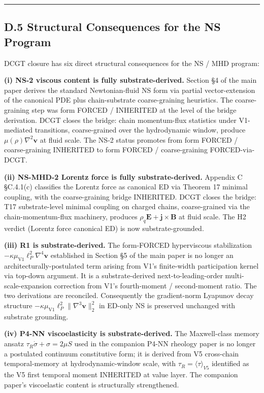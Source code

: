 \documentclass[
]{article}
\begin{document}
\begin{center}\rule{0.5\linewidth}{0.5pt}\end{center}

\subsection{D.5 Structural Consequences for the NS
Program}\label{d.5-structural-consequences-for-the-ns-program}

DCGT closure has six direct structural consequences for the NS / MHD
program:

\textbf{(i) NS-2 viscous content is fully substrate-derived.} Section §4
of the main paper derives the standard Newtonian-fluid NS form via
partial vector-extension of the canonical PDE plus chain-substrate
coarse-graining heuristics. The coarse-graining step was form FORCED /
INHERITED at the level of the bridge derivation. DCGT closes the bridge:
chain momentum-flux statistics under V1-mediated transitions,
coarse-grained over the hydrodynamic window, produce
\(\mu(\rho)\nabla^2\mathbf{v}\) at fluid scale. The NS-2 status promotes
from form FORCED / coarse-graining INHERITED to form FORCED /
coarse-graining FORCED-via-DCGT.

\textbf{(ii) NS-MHD-2 Lorentz force is fully substrate-derived.}
Appendix C §C.4.1(c) classifies the Lorentz force as canonical ED via
Theorem 17 minimal coupling, with the coarse-graining bridge INHERITED.
DCGT closes the bridge: T17 substrate-level minimal coupling on charged
chains, coarse-grained via the chain-momentum-flux machinery, produces
\(\rho_q\mathbf{E} + \mathbf{j}\times\mathbf{B}\) at fluid scale. The H2
verdict (Lorentz force canonical ED) is now substrate-grounded.

\textbf{(iii) R1 is substrate-derived.} The form-FORCED hyperviscous
stabilization \(-\kappa\mu_\mathrm{V1}\ell_P^2\nabla^4\mathbf{v}\)
established in Section §5 of the main paper is no longer an
architecturally-postulated term arising from V1's finite-width
participation kernel via top-down argument. It is a substrate-derived
next-to-leading-order multi-scale-expansion correction from V1's
fourth-moment / second-moment ratio. The two derivations are reconciled.
Consequently the gradient-norm Lyapunov decay structure
\(-\kappa\mu_\mathrm{V1}\ell_P^2\|\nabla^3\mathbf{v}\|_2^2\) in ED-only
NS is preserved unchanged with substrate grounding.

\textbf{(iv) P4-NN viscoelasticity is substrate-derived.} The
Maxwell-class memory ansatz \(\tau_R\dot\sigma + \sigma = 2\mu S\) used
in the companion P4-NN rheology paper is no longer a postulated
continuum constitutive form; it is derived from V5 cross-chain
temporal-memory at hydrodynamic-window scale, with
\(\tau_R = \bigl\langle\tau\bigr\rangle_{V5}\) identified as the V5
first temporal moment INHERITED at value layer. The companion paper's
viscoelastic content is structurally strengthened.
\end{document}
